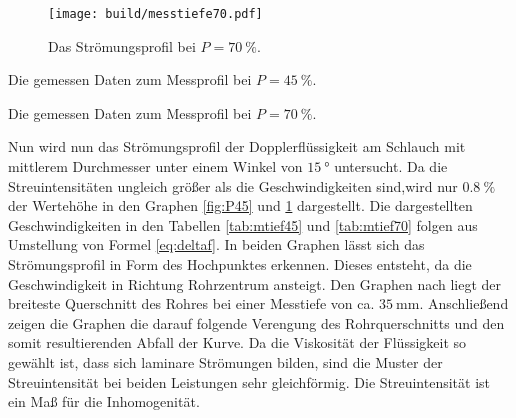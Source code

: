 \begin{figure}
 \centering
 \caption{Das Strömungsprofil bei $P = \SI{70}{\percent}$.}
 \texttt{[image: build/messtiefe70.pdf]}
 \label{fig:P70}
\end{figure}

\begin{table}
 \centering
 \caption{Die gemessen Daten zum Messprofil bei $P = \SI{45}{\percent}$.}
 
 \label{tab:mtief45}
\end{table}

\begin{table}
 \centering
 \caption{Die gemessen Daten zum Messprofil bei $P = \SI{70}{\percent}$.}
 
 \label{tab:mtief70}
\end{table}

Nun wird nun das Strömungsprofil der Dopplerflüssigkeit am Schlauch mit mittlerem
Durchmesser unter einem Winkel von $\SI{15}{\degree}$ untersucht. Da die Streuintensitäten ungleich größer als die Geschwindigkeiten
sind,wird nur $\SI{0.8}{\percent}$ der Wertehöhe in den Graphen \ref{fig:P45} und \ref{fig:P70} dargestellt. Die
dargestellten Geschwindigkeiten in den Tabellen \ref{tab:mtief45} und \ref{tab:mtief70} folgen aus Umstellung von Formel \ref{eq:deltaf}.
 In beiden Graphen lässt sich das Strömungsprofil in Form des Hochpunktes erkennen. Dieses
 entsteht, da die Geschwindigkeit in Richtung Rohrzentrum ansteigt. Den Graphen nach liegt
 der breiteste Querschnitt des Rohres bei einer Messtiefe von ca. $\SI{35}{\milli\meter}$.
 Anschließend zeigen die Graphen die darauf folgende Verengung des Rohrquerschnitts
 und den somit resultierenden Abfall der Kurve. Da die Viskosität der Flüssigkeit so
 gewählt ist, dass sich laminare Strömungen bilden, sind die Muster der Streuintensität
 bei beiden Leistungen sehr gleichförmig. Die Streuintensität ist ein Maß für
 die Inhomogenität.
